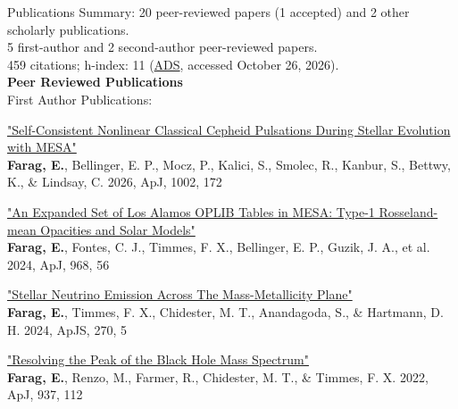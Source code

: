 \begin{rSection}{Publications} %
Summary: 20 peer-reviewed papers (1 accepted) and 2 other scholarly publications. \\
5 first-author and 2 second-author peer-reviewed papers. \\
459 citations; h-index: 11 (\href{https://ui.adsabs.harvard.edu/search/filter_author_facet_hier_fq_author=OR&filter_author_facet_hier_fq_author=author_facet_hier%3A%221%2FFarag%2C%20E%2FFarag%2C%20Ebraheem%22&filter_author_facet_hier_fq_author=author_facet_hier%3A%221%2FFarag%2C%20E%2FFarag%2C%20E%22&fq=%7B!type%3Daqp%20v%3D%24fq_author%7D&fq_author=(author_facet_hier%3A%221%2FFarag%2C%20E%2FFarag%2C%20Ebraheem%22%20OR%20author_facet_hier%3A%221%2FFarag%2C%20E%2FFarag%2C%20E%22)&q=ebraheem%20farag%20year%3A2015-2026&sort=date%20desc%2C%20bibcode%20desc&p_=0}{ADS}, accessed October 26, 2026). \\
\textbf{Peer Reviewed Publications}\\
First Author Publications:
\begin{revnumerate}
\item \href{https://ui.adsabs.harvard.edu/abs/2026ApJ..1002..172F/abstract}{"Self-Consistent Nonlinear Classical Cepheid Pulsations During Stellar Evolution with MESA"}
\\ \textbf{Farag, E.}, Bellinger, E. P., Mocz, P., Kalici, S., Smolec, R., Kanbur, S., Bettwy, K., \& Lindsay, C. 2026, ApJ, 1002, 172

\item \href{https://ui.adsabs.harvard.edu/abs/2024ApJ...968...56F/abstract}{"An Expanded Set of Los Alamos OPLIB Tables in MESA: Type-1 Rosseland-mean Opacities and Solar Models"}
\\ \textbf{Farag, E.}, Fontes, C. J., Timmes, F. X., Bellinger, E. P., Guzik, J. A., et al. 2024, ApJ, 968, 56

\item \href{https://ui.adsabs.harvard.edu/abs/2024ApJS..270....5F/abstract}{"Stellar Neutrino Emission Across The Mass-Metallicity Plane"}
\\ \textbf{Farag, E.}, Timmes, F. X., Chidester, M. T., Anandagoda, S., \& Hartmann, D. H. 2024, ApJS, 270, 5

\item \href{https://ui.adsabs.harvard.edu/abs/2022ApJ...937..112F/abstract}{"Resolving the Peak of the Black Hole Mass Spectrum"}
\\ \textbf{Farag, E.}, Renzo, M., Farmer, R., Chidester, M. T., \& Timmes, F. X. 2022, ApJ, 937, 112


\end{revnumerate}
\end{rSection}
